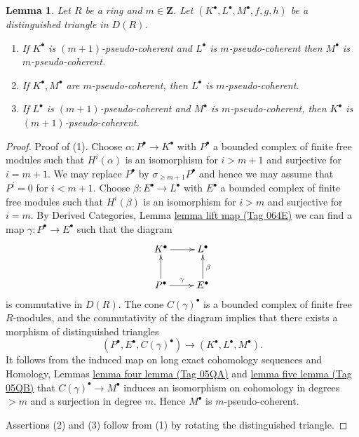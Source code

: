 \documentclass{amsart}
\theoremstyle{plain}
\newtheorem{lemma}[subsection]{Lemma}
\theoremstyle{definition}
\theoremstyle{remark}
\numberwithin{equation}{subsection}
\begin{document}
\begin{lemma}
\label{more-algebra-lemma-cone-pseudo-coherent}
Let $R$ be a ring and $m \in \mathbf{Z}$.
Let $(K^\bullet, L^\bullet, M^\bullet, f, g, h)$ be a distinguished
triangle in $D(R)$.
\begin{enumerate}
\item If $K^\bullet$ is $(m + 1)$-pseudo-coherent and
$L^\bullet$ is $m$-pseudo-coherent then $M^\bullet$ is
$m$-pseudo-coherent.
\item If $K^\bullet, M^\bullet$ are $m$-pseudo-coherent, then
$L^\bullet$ is $m$-pseudo-coherent.
\item If $L^\bullet$ is $(m + 1)$-pseudo-coherent and $M^\bullet$
is $m$-pseudo-coherent, then $K^\bullet$ is $(m + 1)$-pseudo-coherent.
\end{enumerate}
\end{lemma}

\begin{proof}
Proof of (1). Choose $\alpha : P^\bullet \to K^\bullet$
with $P^\bullet$ a bounded complex of finite free modules
such that $H^i(\alpha)$ is an isomorphism for $i > m + 1$ and
surjective for $i = m + 1$. We may replace $P^\bullet$ by
$\sigma_{\geq m + 1}P^\bullet$ and hence we may assume that $P^i = 0$
for $i < m + 1$. Choose $\beta : E^\bullet \to L^\bullet$ with $E^\bullet$
a bounded complex of finite free modules such that
$H^i(\beta)$ is an isomorphism for $i > m$ and
surjective for $i = m$. By
Derived Categories,
Lemma \href{https://stacks.math.columbia.edu/tag/064E}{lemma lift map (Tag 064E)}
we can find a map $\gamma : P^\bullet \to E^\bullet$ such that the diagram
$$
\xymatrix{
K^\bullet \ar[r] & L^\bullet \\
P^\bullet \ar[u] \ar[r]^\gamma & E^\bullet \ar[u]_\beta
}
$$
is commutative in $D(R)$. The cone $C(\gamma)^\bullet$ is a bounded
complex of finite free $R$-modules, and the commutativity of the
diagram implies that there exists a morphism of distinguished triangles
$$
(P^\bullet, E^\bullet, C(\gamma)^\bullet)
\longrightarrow
(K^\bullet, L^\bullet, M^\bullet).
$$
It follows from the induced map on long exact cohomology sequences and
Homology, Lemmas \href{https://stacks.math.columbia.edu/tag/05QA}{lemma four lemma (Tag 05QA)} and
\href{https://stacks.math.columbia.edu/tag/05QB}{lemma five lemma (Tag 05QB)}
that $C(\gamma)^\bullet \to M^\bullet$ induces an isomorphism
on cohomology in degrees $> m$ and a surjection in degree $m$.
Hence $M^\bullet$ is $m$-pseudo-coherent.

\medskip\noindent
Assertions (2) and (3) follow from (1) by rotating the distinguished
triangle.
\end{proof}
\end{document}
